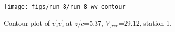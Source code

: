\begin{figure}[H]
\centering
\texttt{[image: figs/run\_8/run\_8\_ww\_contour]}
\caption{Contour plot of $\overline{v_{z}^{\prime} v_{z}^{\prime}}$ at $z/c$=5.37, $V_{free}$=29.12, station 1.}
\label{fig:run_8_ww_contour}
\end{figure}



